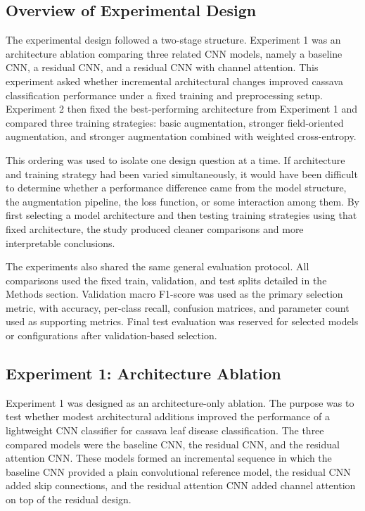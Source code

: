 \documentclass[11pt]{article}
\begin{document}
\subsection{Overview of Experimental Design}

The experimental design followed a two-stage structure. Experiment 1 was an architecture ablation comparing three related CNN models, namely a baseline CNN, a residual CNN, and a residual CNN with channel attention. This experiment asked whether incremental architectural changes improved cassava classification performance under a fixed training and preprocessing setup. Experiment 2 then fixed the best-performing architecture from Experiment 1 and compared three training strategies: basic augmentation, stronger field-oriented augmentation, and stronger augmentation combined with weighted cross-entropy.

This ordering was used to isolate one design question at a time. If architecture and training strategy had been varied simultaneously, it would have been difficult to determine whether a performance difference came from the model structure, the augmentation pipeline, the loss function, or some interaction among them. By first selecting a model architecture and then testing training strategies using that fixed architecture, the study produced cleaner comparisons and more interpretable conclusions.

The experiments also shared the same general evaluation protocol. All comparisons used the fixed train, validation, and test splits detailed in the Methods section. Validation macro F1-score was used as the primary selection metric, with accuracy, per-class recall, confusion matrices, and parameter count used as supporting metrics. Final test evaluation was reserved for selected models or configurations after validation-based selection.

\subsection{Experiment 1: Architecture Ablation}

Experiment 1 was designed as an architecture-only ablation. The purpose was to test whether modest architectural additions improved the performance of a lightweight CNN classifier for cassava leaf disease classification. The three compared models were the baseline CNN, the residual CNN, and the residual attention CNN. These models formed an incremental sequence in which the baseline CNN provided a plain convolutional reference model, the residual CNN added skip connections, and the residual attention CNN added channel attention on top of the residual design.
\end{document}
